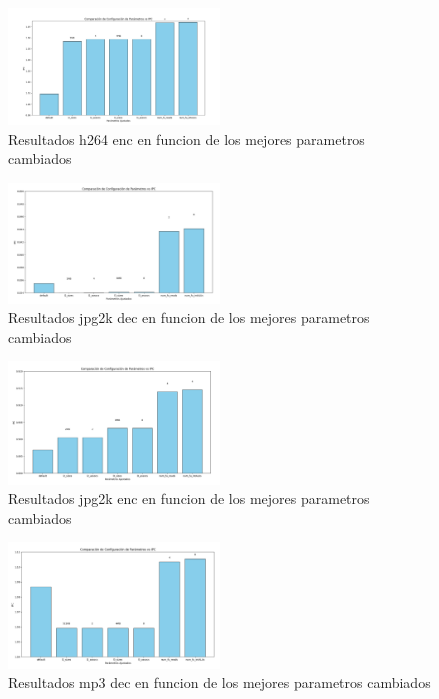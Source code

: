 \documentclass[conference]{IEEEtran}
\begin{document}
\begin{figure}[htbp]
\centering
\includegraphics[width=0.5\textwidth]{Barras_IPC_2.png}
\caption{Resultados h264 enc en funcion de los mejores parametros cambiados}
\label{fig:example}
\end{figure}
\newpage
\begin{figure}[htbp]
\centering
\includegraphics[width=0.5\textwidth]{Barras_IPC_3.png}
\caption{Resultados jpg2k dec en funcion de los mejores parametros cambiados}
\label{fig:example}
\end{figure}
\begin{figure}[htbp]
\centering
\includegraphics[width=0.5\textwidth]{Barras_IPC_4.png}
\caption{Resultados jpg2k enc en funcion de los mejores parametros cambiados}
\label{fig:example}
\end{figure}
\begin{figure}[htbp]
\centering
\includegraphics[width=0.5\textwidth]{Barras_IPC_5.png}
\caption{Resultados mp3 dec en funcion de los mejores parametros cambiados}
\label{fig:example}
\end{figure}
\end{document}
